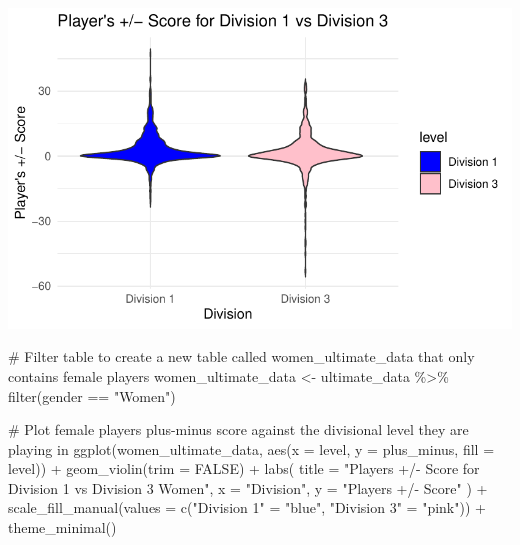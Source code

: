 \documentclass[
  letterpaper,
  DIV=11,
  numbers=noendperiod]{scrartcl}
\newenvironment{Shaded}{\begin{snugshade}}{\end{snugshade}}
\newcommand{\AttributeTok}[1]{\textcolor[rgb]{0.40,0.45,0.13}{#1}}
\newcommand{\CommentTok}[1]{\textcolor[rgb]{0.37,0.37,0.37}{#1}}
\newcommand{\ConstantTok}[1]{\textcolor[rgb]{0.56,0.35,0.01}{#1}}
\newcommand{\FunctionTok}[1]{\textcolor[rgb]{0.28,0.35,0.67}{#1}}
\newcommand{\NormalTok}[1]{\textcolor[rgb]{0.00,0.23,0.31}{#1}}
\newcommand{\OtherTok}[1]{\textcolor[rgb]{0.00,0.23,0.31}{#1}}
\newcommand{\SpecialCharTok}[1]{\textcolor[rgb]{0.37,0.37,0.37}{#1}}
\newcommand{\StringTok}[1]{\textcolor[rgb]{0.13,0.47,0.30}{#1}}
\begin{document}
\includegraphics{final_eda_files/figure-pdf/division-level-&-plus-minus-1.pdf}

\begin{Shaded}
\begin{Highlighting}[]
\CommentTok{\# Filter table to create a new table called women\_ultimate\_data that only contains female players}
\NormalTok{women\_ultimate\_data }\OtherTok{\textless{}{-}}\NormalTok{ ultimate\_data }\SpecialCharTok{\%\textgreater{}\%}
  \FunctionTok{filter}\NormalTok{(gender }\SpecialCharTok{==} \StringTok{"Women"}\NormalTok{)}

\CommentTok{\# Plot female player\textquotesingle{}s plus{-}minus score against the divisional level they are playing in}
\FunctionTok{ggplot}\NormalTok{(women\_ultimate\_data, }\FunctionTok{aes}\NormalTok{(}\AttributeTok{x =}\NormalTok{ level, }\AttributeTok{y =}\NormalTok{ plus\_minus, }\AttributeTok{fill =}\NormalTok{ level)) }\SpecialCharTok{+}
  \FunctionTok{geom\_violin}\NormalTok{(}\AttributeTok{trim =} \ConstantTok{FALSE}\NormalTok{) }\SpecialCharTok{+}
  \FunctionTok{labs}\NormalTok{(}
    \AttributeTok{title =} \StringTok{"Player\textquotesingle{}s +/{-} Score for Division 1 vs Division 3 Women"}\NormalTok{,}
    \AttributeTok{x =} \StringTok{"Division"}\NormalTok{,}
    \AttributeTok{y =} \StringTok{"Player\textquotesingle{}s +/{-} Score"}
\NormalTok{  ) }\SpecialCharTok{+}
  \FunctionTok{scale\_fill\_manual}\NormalTok{(}\AttributeTok{values =} \FunctionTok{c}\NormalTok{(}\StringTok{"Division 1"} \OtherTok{=} \StringTok{"blue"}\NormalTok{, }\StringTok{"Division 3"} \OtherTok{=} \StringTok{"pink"}\NormalTok{)) }\SpecialCharTok{+} 
  \FunctionTok{theme\_minimal}\NormalTok{()}
\end{Highlighting}
\end{Shaded}
\end{document}
